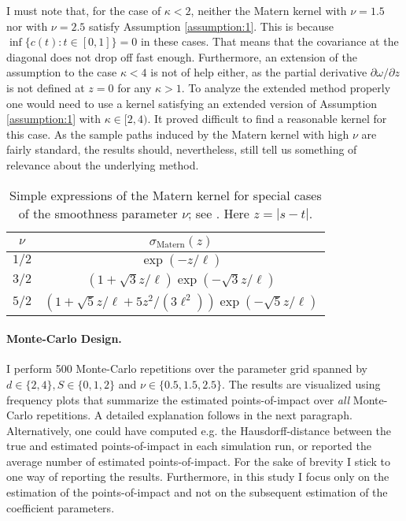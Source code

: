 \smallskip

\begin{remark}
I must note that, for the case of $\kappa < 2$, neither the Matern kernel with $\nu =
1.5$ nor with $\nu = 2.5$ satisfy Assumption \ref{assumption:1}. This is because $\inf
\{ c(t) : t \in [0, 1] \} = 0$ in these cases. That means that the covariance at the
diagonal does not drop off fast enough.  Furthermore, an extension of the assumption to
the case $\kappa < 4$ is not of help either, as the partial derivative $\partial \omega
/ \partial z$ is not defined at $z = 0$ for any $\kappa > 1$. To analyze the extended
method properly one would need to use a kernel satisfying an extended version of
Assumption \ref{assumption:1} with $\kappa \in [2, 4)$. It proved difficult to find a
reasonable kernel for this case. As the sample paths induced by the Matern kernel with
high $\nu$ are fairly standard, the results should, nevertheless, still tell us
something of relevance about the underlying method.
\end{remark}


\begin{table}
    \renewcommand{\arraystretch}{2}
    \centering
    \begin{tabular}{c|c}
        $\nu$ & $\sigma_{\text{Matern}}(z)$ \\ \hline
        $1/2$ & $\exp \left( - z / \ell \right)$\\
        $3/2$ & $\left(1 + \sqrt{3} z / \ell \right)\exp \left( - \sqrt{3}z / \ell \right)$\\
        $5/2$ & $\left(1 + \sqrt{5} z / \ell + 5z^2 / (3\ell^2) \right)\exp \left( -
        \sqrt{5}z / \ell \right)$
    \end{tabular}
    \caption{Simple expressions of the Matern kernel for special cases of the smoothness
    parameter $\nu$; see \cite{Rasmussen2006}. Here $z = |s - t|$.}
    \label{table:matern_kernel}
\end{table}



\paragraph{Monte-Carlo Design.}

I perform 500 Monte-Carlo repetitions over the parameter grid spanned by $d \in \{2, 4\},
S \in \{0, 1, 2\}$ and $\nu \in \{0.5, 1.5, 2.5\}$. The results are visualized using
frequency plots that summarize the estimated points-of-impact over \emph{all}
Monte-Carlo repetitions. A detailed explanation follows in the next paragraph.
Alternatively, one could have computed e.g. the Hausdorff-distance between the true and
estimated points-of-impact in each simulation run, or reported the average number of
estimated points-of-impact. For the sake of brevity I stick to one way of reporting the
results. Furthermore, in this study I focus only on the estimation of the
points-of-impact and not on the subsequent estimation of the coefficient parameters.


